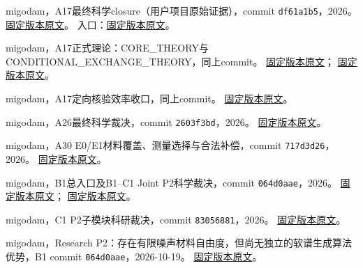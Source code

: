 migodam，A17最终科学closure（用户项目原始证据），commit \texttt{df61a1b5}，2026。
\href{https://github.com/migodam/a17-maxwell-certified-exchange/blob/df61a1b533682a883cdaf65259b4528c354bd832/closure_final/reports/A17_CLOSURE_REPORT_ZH.md}{固定版本原文}。
入口：\href{https://github.com/migodam/a17-maxwell-certified-exchange/blob/df61a1b533682a883cdaf65259b4528c354bd832/closure_final/START_HERE.md}{固定版本原文}。

migodam，A17正式理论：CORE\_THEORY与CONDITIONAL\_EXCHANGE\_THEORY，同上commit。
\href{https://github.com/migodam/a17-maxwell-certified-exchange/blob/df61a1b533682a883cdaf65259b4528c354bd832/closure_final/manuscript/CORE_THEORY.tex}{固定版本原文}；
\href{https://github.com/migodam/a17-maxwell-certified-exchange/blob/df61a1b533682a883cdaf65259b4528c354bd832/closure_final/manuscript/CONDITIONAL_EXCHANGE_THEORY.tex}{固定版本原文}。

migodam，A17定向核验效率收口，同上commit。
\href{https://github.com/migodam/a17-maxwell-certified-exchange/blob/df61a1b533682a883cdaf65259b4528c354bd832/efficiency_followup/A17_EFFICIENT_VERIFICATION_FINAL.md}{固定版本原文}。

migodam，A26最终科学裁决，commit \texttt{2603f3bd}，2026。
\href{https://github.com/migodam/a26-om-feedback-prior-completion/blob/2603f3bd16c48e48587fedc4363975779def17f5/A26_FINAL_DECISION.md}{固定版本原文}。

migodam，A30 E0/E1材料覆盖、测量选择与合法补偿，commit \texttt{717d3d26}，2026。
\href{https://github.com/migodam/a30-maxwell-observable-material-manifold/blob/717d3d26a290248bd2b9aeb55f3d03694b407b84/A30_E0_E1_DECISION.md}{固定版本原文}。

migodam，B1总入口及B1--C1 Joint P2科学裁决，commit \texttt{064d0aae}，2026。
\href{https://github.com/migodam/b1-probabilistic-maxwell-imaging/blob/064d0aaed9772cadd573866eec84f159895b317b/START_HERE.md}{固定版本原文}；
\href{https://github.com/migodam/b1-probabilistic-maxwell-imaging/blob/064d0aaed9772cadd573866eec84f159895b317b/research/joint_p2/GATE_DECISION.md}{固定版本原文}。

migodam，C1 P2子模块科研裁决，commit \texttt{83056881}，2026。
\href{https://github.com/migodam/c1-physics-state-generative-imaging/blob/83056881e89329212b16f5be47a4d0dbc4465943/p2/C1_P2_DECISION.md}{固定版本原文}。

migodam，Research P2：存在有限噪声材料自由度，但尚无独立的软谱生成算法优势，B1 commit \texttt{064d0aae}，2026-10-19。
\href{https://github.com/migodam/b1-probabilistic-maxwell-imaging/blob/064d0aaed9772cadd573866eec84f159895b317b/research/p2_material_fiber_20261019/RESEARCH_REPORT_ZH.md}{固定版本原文}。

